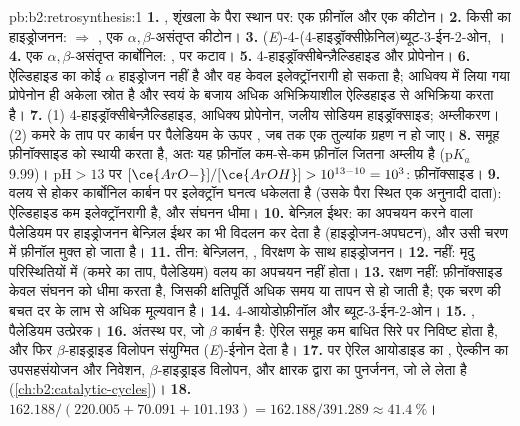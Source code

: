 \begin{solution}{pb:b2:retrosynthesis:1}
\textbf{1.} ,  शृंखला के पैरा स्थान पर: एक फ़ीनॉल और एक कीटोन।
\textbf{2.} किसी  का हाइड्रोजनन:  $\Rightarrow$ , एक
$\alpha,\beta$-असंतृप्त कीटोन।
\textbf{3.} (\textit{E})-4-(4-हाइड्रॉक्सीफ़ेनिल)ब्यूट-3-ईन-2-ओन, ।
\textbf{4.} एक $\alpha,\beta$-असंतृप्त कार्बोनिल: ,  पर कटाव।
\textbf{5.} 4-हाइड्रॉक्सीबेन्ज़ैल्डिहाइड और प्रोपेनोन।
\textbf{6.} ऐल्डिहाइड का कोई $\alpha$ हाइड्रोजन नहीं है और वह केवल इलेक्ट्रॉनरागी हो सकता है; आधिक्य में लिया गया प्रोपेनोन
ही अकेला  स्रोत है और स्वयं के बजाय अधिक अभिक्रियाशील ऐल्डिहाइड से अभिक्रिया करता है।
\textbf{7.} (1) 4-हाइड्रॉक्सीबेन्ज़ैल्डिहाइड, आधिक्य प्रोपेनोन, जलीय सोडियम हाइड्रॉक्साइड; अम्लीकरण। (2)
कमरे के ताप पर कार्बन पर पैलेडियम के ऊपर , जब तक एक तुल्यांक ग्रहण न हो जाए।
\textbf{8.}  समूह फ़ीनॉक्साइड को स्थायी करता है, अतः यह फ़ीनॉल कम-से-कम फ़ीनॉल जितना अम्लीय है
($\mathrm pK_a$ 9.99)। $\mathrm{pH} > 13$ पर $[\ce{ArO-}]/[\ce{ArOH}] > 10^{13-10} = 10^3$:
फ़ीनॉक्साइड।
\textbf{9.}  वलय से होकर कार्बोनिल कार्बन पर इलेक्ट्रॉन घनत्व धकेलता है (उसके पैरा स्थित एक
अनुनादी दाता): ऐल्डिहाइड कम इलेक्ट्रॉनरागी है, और संघनन धीमा।
\textbf{10.} बेन्ज़िल ईथर:  का अपचयन करने वाला पैलेडियम पर हाइड्रोजनन
बेन्ज़िल ईथर का भी विदलन कर देता है (हाइड्रोजन-अपघटन), और उसी चरण में फ़ीनॉल मुक्त हो जाता है।
\textbf{11.} तीन: बेन्ज़िलन, , विरक्षण के साथ हाइड्रोजनन।
\textbf{12.} नहीं: मृदु परिस्थितियों में (कमरे का ताप, पैलेडियम)  वलय का अपचयन नहीं होता।
\textbf{13.} रक्षण नहीं: फ़ीनॉक्साइड केवल संघनन को धीमा करता है, जिसकी क्षतिपूर्ति अधिक समय या तापन से
हो जाती है; एक चरण की बचत दर के लाभ से अधिक मूल्यवान है।
\textbf{14.} 4-आयोडोफ़ीनॉल और ब्यूट-3-ईन-2-ओन।
\textbf{15.} , पैलेडियम उत्प्रेरक।
\textbf{16.} अंतस्थ  पर, जो $\beta$ कार्बन है: ऐरिल समूह कम बाधित सिरे पर निविष्ट होता है,
और फिर $\beta$-हाइड्राइड विलोपन संयुग्मित (\textit{E})-ईनोन देता है।
\textbf{17.}  पर ऐरिल आयोडाइड का , ऐल्कीन का उपसहसंयोजन और निवेशन,
$\beta$-हाइड्राइड विलोपन, और क्षारक द्वारा  का पुनर्जनन, जो  ले लेता है
(\cref{ch:b2:catalytic-cycles})।
\textbf{18.} $162.188/(220.005 + 70.091 + 101.193) = 162.188/391.289 \approx 41.4~\%$।

\end{solution}
